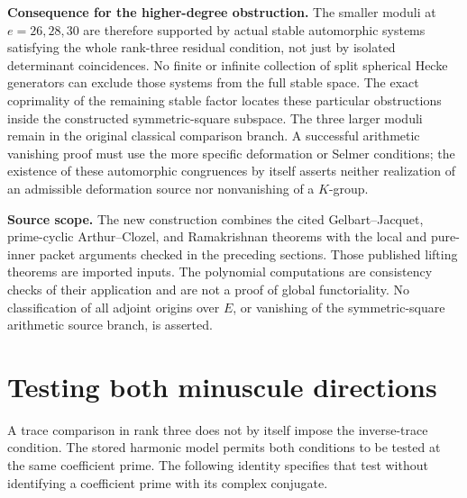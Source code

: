 \documentclass[11pt,a4paper]{article}
\theoremstyle{definition}
\renewcommand{\paragraph}[1]{\par\smallskip\noindent\textbf{#1}\quad\ignorespaces}
\begin{document}
\paragraph{Consequence for the higher-degree obstruction.}
The smaller moduli at $e=26,28,30$ are therefore supported by
actual stable automorphic systems satisfying the whole
rank-three residual condition, not just by isolated
determinant coincidences.  No finite or infinite collection
of split spherical Hecke generators can exclude those
systems from the full stable space.  The exact coprimality
of the remaining stable factor locates these particular
obstructions inside the constructed symmetric-square
subspace.  The three larger moduli remain in the original
classical comparison branch.  A successful arithmetic
vanishing proof must use the more specific deformation or
Selmer conditions; the existence of these automorphic
congruences by itself asserts neither realization of an
admissible deformation source nor nonvanishing of a
$K$-group.

\paragraph{Source scope.}
The new construction combines the cited Gelbart--Jacquet,
prime-cyclic Arthur--Clozel, and Ramakrishnan theorems with
the local and pure-inner packet arguments checked in the
preceding sections.  Those published lifting theorems are
imported inputs.  The polynomial computations are consistency
checks of their application and are not a proof of global
functoriality.  No classification of all adjoint origins over
$E$, or vanishing of the symmetric-square arithmetic source
branch, is asserted.



\section{Testing both minuscule directions}
\label{sec:kt-dual-hecke}

A trace comparison in rank three does not by itself impose the
inverse-trace condition.  The stored harmonic model permits both
conditions to be tested at the same coefficient prime.  The following
identity specifies that test without identifying a coefficient prime
with its complex conjugate.
\end{document}
